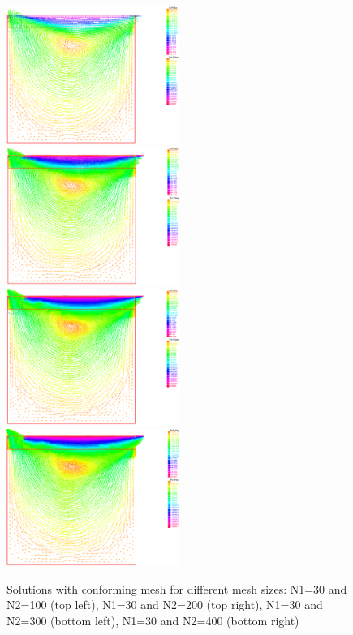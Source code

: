 \documentclass{article}
\begin{document}
\begin{figure}[H] \label{fig:sol_conf}
	\includegraphics[width=0.5\textwidth]{imgs/solution-C_100_30.PNG}
	\includegraphics[width=0.5\textwidth]{imgs/solution-C_200_30.PNG}
	\includegraphics[width=0.5\textwidth]{imgs/solution-C_300_30.PNG}
	\includegraphics[width=0.5\textwidth]{imgs/solution-C_400_30.PNG}
	\caption{Solutions with conforming mesh for different mesh sizes: N1=30 and N2=100 (top left), N1=30 and N2=200 (top right), N1=30 and N2=300 (bottom left), N1=30 and N2=400 (bottom right)}
\end{figure}
\end{document}
